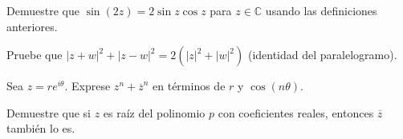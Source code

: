 \begin{exercise}
Demuestre que $\sin(2z)=2\sin z\cos z$ para $z\in\mathbb{C}$ usando las definiciones anteriores.
\end{exercise}

\begin{exercise}
Pruebe que $|z+w|^2+|z-w|^2=2(|z|^2+|w|^2)$ (identidad del paralelogramo).
\end{exercise}

\begin{exercise}
Sea $z=re^{i\theta}$. Exprese $z^n+\overline{z}^n$ en términos de $r$ y $\cos(n\theta)$.
\end{exercise}

\begin{exercise}
Demuestre que si $z$ es raíz del polinomio $p$ con coeficientes reales, entonces $\overline{z}$ también lo es.
\end{exercise}
